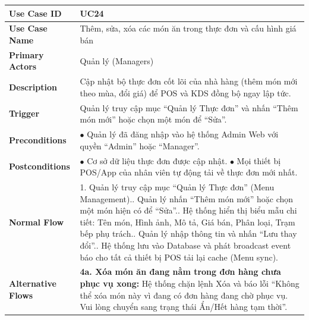 \begin{longtable}{|p{3.5cm}|p{12.5cm}|}
\hline
\textbf{Use Case ID} & UC24 \\ \hline
\textbf{Use Case Name} & Thêm, sửa, xóa các món ăn trong thực đơn và cấu hình giá bán \\ \hline
\textbf{Primary Actors} & Quản lý (Managers) \\ \hline
\textbf{Description} & Cập nhật bộ thực đơn cốt lõi của nhà hàng (thêm món mới theo mùa, đổi giá) để POS và KDS đồng bộ ngay lập tức. \\ \hline
\textbf{Trigger} & Quản lý truy cập mục ``Quản lý Thực đơn'' và nhấn ``Thêm món mới'' hoặc chọn một món để ``Sửa''. \\ \hline
\textbf{Preconditions} & $\bullet$ Quản lý đã đăng nhập vào hệ thống Admin Web với quyền ``Admin'' hoặc ``Manager''. \\ \hline
\textbf{Postconditions} &
$\bullet$ Cơ sở dữ liệu thực đơn được cập nhật.\newline
$\bullet$ Mọi thiết bị POS/App của nhân viên tự động tải về thực đơn mới nhất. \\ \hline
\textbf{Normal Flow} &
1. Quản lý truy cập mục ``Quản lý Thực đơn'' (Menu Management).\newline
2. Quản lý nhấn ``Thêm món mới'' hoặc chọn một món hiện có để ``Sửa''.\newline
3. Hệ thống hiển thị biểu mẫu chi tiết: Tên món, Hình ảnh, Mô tả, Giá bán, Phân loại, Trạm bếp phụ trách.\newline
4. Quản lý nhập thông tin và nhấn ``Lưu thay đổi''.\newline
5. Hệ thống lưu vào Database và phát broadcast event báo cho tất cả thiết bị POS tải lại cache (Menu sync). \\ \hline
\textbf{Alternative Flows} &
\textbf{4a. Xóa món ăn đang nằm trong đơn hàng chưa phục vụ xong:} Hệ thống chặn lệnh Xóa và báo lỗi ``Không thể xóa món này vì đang có đơn hàng đang chờ phục vụ. Vui lòng chuyển sang trạng thái Ẩn/Hết hàng tạm thời''. \\ \hline
\end{longtable}

